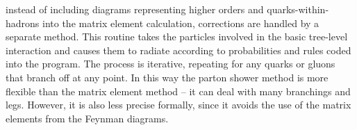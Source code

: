instead of including diagrams representing 
higher orders and quarks-within-hadrons 
into the matrix element calculation, 
corrections are handled 
by a separate 
method.  
This routine takes the 
particles involved in the 
basic tree-level interaction 
and 
causes them to radiate 
according to 
probabilities and rules coded into the program.  
The process is iterative, 
repeating for any quarks or gluons that 
branch off at any point.  
In this way the parton shower method 
is more flexible than the matrix element method -- 
it can deal with many branchings and legs. 
However, it is also less precise formally, 
since it avoids the use of the matrix elements 
from the Feynman diagrams.  



